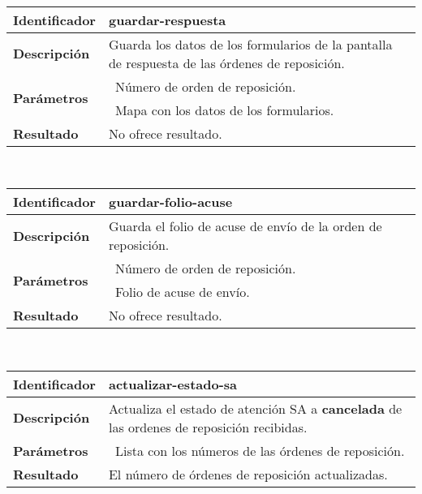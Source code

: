 	\vspace{5mm}\\
	\begin{tabular}{|p{}|p{}|}
		\hline
		\textbf{Identificador}	& \textbf{guardar-respuesta}\\
		\hline
		\hline
		\textbf{Descripción}	& Guarda los datos de los formularios de la pantalla de respuesta de las órdenes de reposición.\\
		\hline
		\multirow{2}{*}{\textbf{Parámetros}}	& \textbullet\, Número de orden de reposición.\\
												& \textbullet\, Mapa con los datos de los formularios.\\
		\hline
		\textbf{Resultado}		& No ofrece resultado.\\
		\hline
	\end{tabular}
	\vspace{5mm}\\
	\begin{tabular}{|p{}|p{}|}
		\hline
		\textbf{Identificador}	& \textbf{guardar-folio-acuse}\\
		\hline
		\hline
		\textbf{Descripción}	& Guarda el folio de acuse de envío de la orden de reposición.\\
		\hline
		\multirow{2}{*}{\textbf{Parámetros}} 	& \textbullet\, Número de orden de reposición.\\
												& \textbullet\, Folio de acuse de envío.\\
		\hline
		\textbf{Resultado}		& No ofrece resultado.\\
		\hline
	\end{tabular}
	\vspace{5mm}\\
	\begin{tabular}{|p{}|p{}|}
		\hline
		\textbf{Identificador}	& \textbf{actualizar-estado-sa}\\
		\hline
		\hline
		\textbf{Descripción}	& Actualiza el estado de atención SA a \textbf{cancelada} de las ordenes de reposición recibidas.\\
		\hline
		\textbf{Parámetros} 	& \textbullet\, Lista con los números de las órdenes de reposición.\\
		\hline
		\textbf{Resultado}		& El número de órdenes de reposición actualizadas.\\
		\hline
	\end{tabular}
